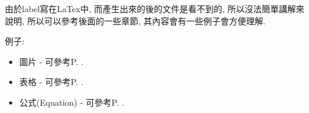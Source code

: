 由於label寫在LaTex中, 而產生出來的後的文件是看不到的, 所以沒法簡單講解來說明, 所以可以參考後面的一些章節, 其內容會有一些例子會方便理解.

例子:
\begin{itemize}
  \item 圖片 - 可參考P. .

  \item 表格 - 可參考P. .

  \item 公式(Equation) - 可參考P. .
\end{itemize}

